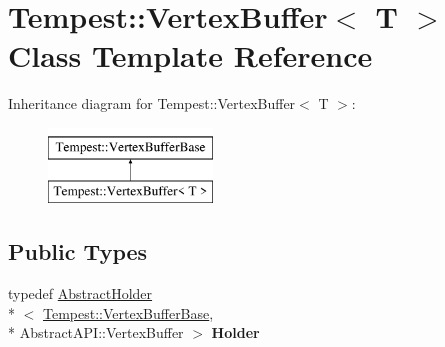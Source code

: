 \hypertarget{class_tempest_1_1_vertex_buffer}{\section{Tempest\+:\+:Vertex\+Buffer$<$ T $>$ Class Template Reference}
\label{class_tempest_1_1_vertex_buffer}
}
Inheritance diagram for Tempest\+:\+:Vertex\+Buffer$<$ T $>$\+:\begin{figure}[H]
\begin{center}
\leavevmode
\includegraphics[height=2.000000cm]{class_tempest_1_1_vertex_buffer}
\end{center}
\end{figure}
\subsection*{Public Types}
\begin{DoxyCompactItemize}
\item 
\hypertarget{class_tempest_1_1_vertex_buffer_a2cc31f85c2ed0a4b2e785ed79f1a70d9}{typedef \hyperlink{class_tempest_1_1_abstract_holder}{Abstract\+Holder}\\*
$<$ \hyperlink{class_tempest_1_1_vertex_buffer_base}{Tempest\+::\+Vertex\+Buffer\+Base}, \\*
Abstract\+A\+P\+I\+::\+Vertex\+Buffer $>$ {\bfseries Holder}}\label{class_tempest_1_1_vertex_buffer_a2cc31f85c2ed0a4b2e785ed79f1a70d9}

\end{DoxyCompactItemize}

